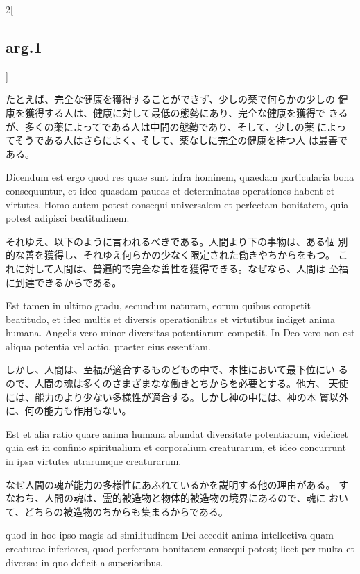 \documentclass[paper=a4paper,fontsize=10pt,jafontsize=9pt,titlepage]{jlreq}
\begin{document}
\begin{paracol}{2}[\subsection{arg.1}]
 \switchcolumn

 たとえば、完全な健康を獲得することができず、少しの薬で何らかの少しの
 健康を獲得する人は、健康に対して最低の態勢にあり、完全な健康を獲得で
 きるが、多くの薬によってである人は中間の態勢であり、そして、少しの薬
 によってそうである人はさらによく、そして、薬なしに完全の健康を持つ人
 は最善である。


 \switchcolumn*

Dicendum est ergo quod res quae sunt infra hominem, quaedam
 particularia bona consequuntur, et ideo quasdam paucas et
 determinatas operationes habent et virtutes. Homo autem potest
 consequi universalem et perfectam bonitatem, quia potest adipisci
 beatitudinem.
 
 \switchcolumn

 それゆえ、以下のように言われるべきである。人間より下の事物は、ある個
 別的な善を獲得し、それゆえ何らかの少なく限定された働きやちからをもつ。
 これに対して人間は、普遍的で完全な善性を獲得できる。なぜなら、人間は
 至福に到達できるからである。


 \switchcolumn*

 Est tamen in ultimo gradu, secundum naturam, eorum quibus competit
 beatitudo, et ideo multis et diversis operationibus et virtutibus
 indiget anima humana. Angelis vero minor diversitas potentiarum
 competit. In Deo vero non est aliqua potentia vel actio, praeter eius
 essentiam.
 
 \switchcolumn

 しかし、人間は、至福が適合するものどもの中で、本性において最下位にい
 るので、人間の魂は多くのさまざまなな働きとちからを必要とする。他方、
 天使には、能力のより少ない多様性が適合する。しかし神の中には、神の本
 質以外に、何の能力も作用もない。


 \switchcolumn*

 Est et alia ratio quare anima humana abundat diversitate potentiarum,
 videlicet quia est in confinio spiritualium et corporalium
 creaturarum, et ideo concurrunt in ipsa virtutes utrarumque
 creaturarum.

 \switchcolumn

 なぜ人間の魂が能力の多様性にあふれているかを説明する他の理由がある。
 すなわち、人間の魂は、霊的被造物と物体的被造物の境界にあるので、魂に
 おいて、どちらの被造物のちからも集まるからである。

 
 quod in hoc ipso magis ad
 similitudinem Dei accedit anima intellectiva quam creaturae
 inferiores, quod perfectam bonitatem consequi potest; licet per multa
 et diversa; in quo deficit a superioribus.


\end{paracol}
\end{document}
